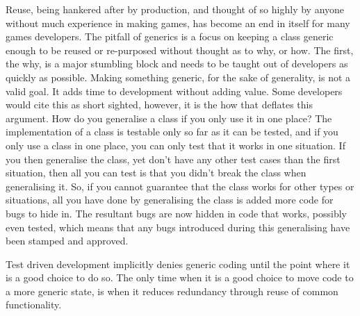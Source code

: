 Reuse, being hankered after by production, and thought of so highly by anyone
without much experience in making games, has become an end in itself for many
games developers. The pitfall of generics is a focus on keeping a class generic
enough to be reused or re-purposed without thought as to why, or how. The
first, the why, is a major stumbling block and needs to be taught out of
developers as quickly as possible. Making something generic, for the sake of
generality, is not a valid goal. It adds time to development without adding
value. Some developers would cite this as short sighted, however, it is the how
that deflates this argument. How do you generalise a class if you only use it
in one place? The implementation of a class is testable only so far as it can
be tested, and if you only use a class in one place, you can only test that it
works in one situation. If you then generalise the class, yet don't have any
other test cases than the first situation, then all you can test is that you
didn't break the class when generalising it. So, if you cannot guarantee that
the class works for other types or situations, all you have done by
generalising the class is added more code for bugs to hide in. The resultant
bugs are now hidden in code that works, possibly even tested, which means that
any bugs introduced during this generalising have been stamped and approved.

Test driven development implicitly denies generic coding until the point where
it is a good choice to do so. The only time when it is a good choice to move
code to a more generic state, is when it reduces redundancy through reuse of
common functionality.

